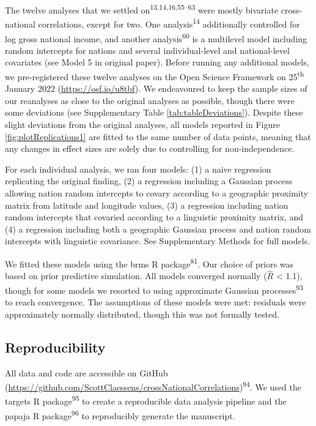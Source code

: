 \documentclass[
  man,floatsintext]{apa6}
\begin{document}
The twelve analyses that we settled on\textsuperscript{13,14,16,55--63} were mostly bivariate cross-national correlations, except for two. One analysis\textsuperscript{14} additionally controlled for log gross national income, and another analysis\textsuperscript{60} is a multilevel model including random intercepts for nations and several individual-level and national-level covariates (see Model 5 in original paper). Before running any additional models, we pre-registered these twelve analyses on the Open Science Framework on 25\textsuperscript{th} January 2022 (\url{https://osf.io/u8tbf}). We endeavoured to keep the sample sizes of our reanalyses as close to the original analyses as possible, though there were some deviations (see Supplementary Table \ref{tab:tableDeviations}). Despite these slight deviations from the original analyses, all models reported in Figure \ref{fig:plotReplications1} are fitted to the same number of data points, meaning that any changes in effect sizes are solely due to controlling for non-independence.

For each individual analysis, we ran four models: (1) a naive regression replicating the original finding, (2) a regression including a Gaussian process allowing nation random intercepts to covary according to a geographic proximity matrix from latitude and longitude values, (3) a regression including nation random intercepts that covaried according to a linguistic proximity matrix, and (4) a regression including both a geographic Gaussian process and nation random intercepts with linguistic covariance. See Supplementary Methods for full models.

We fitted these models using the brms R package\textsuperscript{81}. Our choice of priors was based on prior predictive simulation. All models converged normally (\(\hat{R}\) \textless{} 1.1), though for some models we resorted to using approximate Gaussian processes\textsuperscript{93} to reach convergence. The assumptions of these models were met: residuals were approximately normally distributed, though this was not formally tested.

\hypertarget{reproducibility}{%
\subsection{Reproducibility}\label{reproducibility}}

All data and code are accessible on GitHub (\url{https://github.com/ScottClaessens/crossNationalCorrelations})\textsuperscript{94}. We used the targets R package\textsuperscript{95} to create a reproducible data analysis pipeline and the papaja R package\textsuperscript{96} to reproducibly generate the manuscript.
\end{document}
